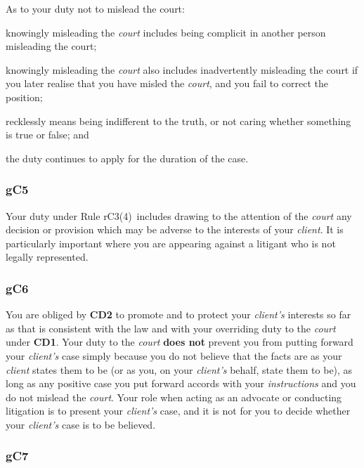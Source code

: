 As to your duty not to mislead the court:
\begin{numlist}\item knowingly misleading the \emph{court} includes being complicit in
another person misleading the court;
\item knowingly misleading the \emph{court} also includes inadvertently
misleading the court if you later realise that you have misled the
\emph{court}, and you fail to correct the position;
\item recklessly means being indifferent to the truth, or not caring
whether something is true or false; and
\item the duty continues to apply for the duration of the case.
\end{numlist}
\subsubsection{\color{darkgrey}gC5}

Your duty under Rule rC3(4)~includes drawing to the attention of the
\emph{court} any decision or provision which may be adverse to the
interests of your \emph{client}. It is particularly important where you
are appearing against a litigant who is not legally represented.

\subsubsection{\color{darkgrey}gC6}

You are obliged by \textbf{\textcolor{mygold}{CD2}} to promote and to protect your \emph{client's}
interests so far as that is consistent with the law and with your
overriding duty to the \emph{court} under \textbf{\textcolor{mygold}{CD1}}. Your duty to the
\emph{court} \textcolor{myred}{\textbf{does not}} prevent you from putting forward your
\emph{client's} case simply because you do not believe that the facts
are as your \emph{client} states them to be (or as you, on your
\emph{client's} behalf, state them to be), as long as any positive case
you put forward accords with your \emph{instructions} and you do not
mislead the \emph{court}. Your role when acting as an advocate or
conducting litigation is to present your \emph{client's} case, and it is
not for you to decide whether your \emph{client's} case is to be
believed.

\subsubsection{\color{darkgrey}gC7}

